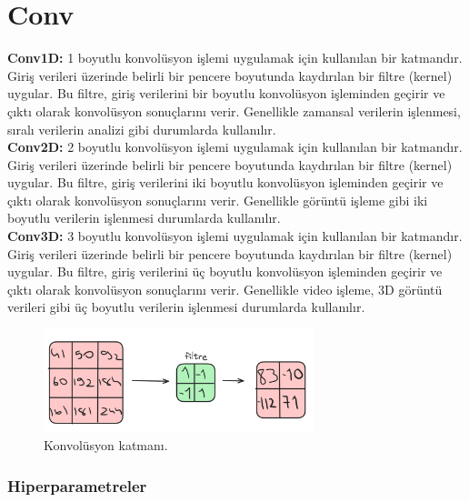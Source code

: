 \section{Conv}
\textbf{Conv1D:} 1 boyutlu konvolüsyon işlemi uygulamak için kullanılan bir katmandır. Giriş verileri üzerinde belirli bir pencere boyutunda kaydırılan bir filtre (kernel) uygular. Bu filtre, giriş verilerini bir boyutlu konvolüsyon işleminden geçirir ve çıktı olarak konvolüsyon sonuçlarını verir. Genellikle zamansal verilerin işlenmesi, sıralı verilerin analizi gibi durumlarda kullanılır.\\
\textbf{Conv2D:} 2 boyutlu konvolüsyon işlemi uygulamak için kullanılan bir katmandır. Giriş verileri üzerinde belirli bir pencere boyutunda kaydırılan bir filtre (kernel) uygular. Bu filtre, giriş verilerini iki boyutlu konvolüsyon işleminden geçirir ve çıktı olarak konvolüsyon sonuçlarını verir. Genellikle görüntü işleme gibi iki boyutlu verilerin işlenmesi durumlarda kullanılır. \\
\textbf{Conv3D:} 3 boyutlu konvolüsyon işlemi uygulamak için kullanılan bir katmandır. Giriş verileri üzerinde belirli bir pencere boyutunda kaydırılan bir filtre (kernel) uygular. Bu filtre, giriş verilerini üç boyutlu konvolüsyon işleminden geçirir ve çıktı olarak konvolüsyon sonuçlarını verir. Genellikle video işleme, 3D görüntü verileri gibi üç boyutlu verilerin işlenmesi durumlarda kullanılır.

\begin{figure}[h]
    \centering
    \includegraphics[width=0.7\textwidth]{images/conv_layer.png}
    \caption{Konvolüsyon katmanı.}
    \label{fig:enter-label}
\end{figure}

\subsubsection{Hiperparametreler}
\begin{table}[h]
\centering
{\scriptsize\renewcommand{\arraystretch}{0.4}
{}}
\end{table}

\newpage